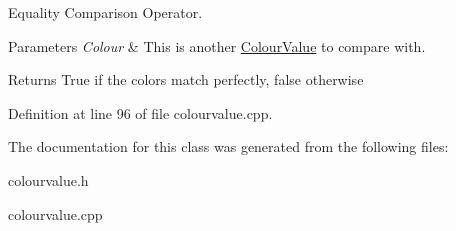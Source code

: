 Equality Comparison Operator. 


\begin{DoxyParams}{Parameters}
{\em Colour} & This is another \hyperlink{classphys_1_1ColourValue}{ColourValue} to compare with. \\
\hline
\end{DoxyParams}
\begin{DoxyReturn}{Returns}
True if the colors match perfectly, false otherwise 
\end{DoxyReturn}


Definition at line 96 of file colourvalue.cpp.



The documentation for this class was generated from the following files:\begin{DoxyCompactItemize}
\item 
colourvalue.h\item 
colourvalue.cpp\end{DoxyCompactItemize}
